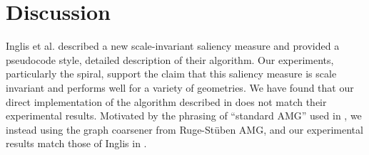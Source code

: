 \documentclass[12pt]{article}%
\begin{document}
\section{Discussion}
Inglis et al. described a new scale-invariant saliency measure and provided a pseudocode style, detailed description of their algorithm.  Our experiments, particularly the spiral, support the claim that this saliency measure is scale invariant and performs well for a variety of geometries.  We have found that our direct implementation of the algorithm described in \cite{inglis:2010} does not match their experimental results.  Motivated by the phrasing of ``standard AMG'' used in \cite{inglis:2010}, we instead using the graph coarsener from Ruge-St\"uben AMG, and our experimental results match those of Inglis in \cite{inglis:2010}.





\end{document}

